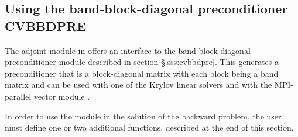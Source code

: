 \subsection{Using the band-block-diagonal preconditioner CVBBDPRE}
The adjoint module in {\cvodes} offers an interface to the band-block-diagonal
preconditioner module {\cvbbdpre} described in section \S\ref{sss:cvbbdpre}.
This generates a preconditioner that is a block-diagonal matrix with each
block being a band matrix and can be used with one of the Krylov linear solvers
and with the MPI-parallel vector module {\nvecp}.

In order to use the {\cvbbdpre} module in the solution of the backward problem,
the user must define one or two additional functions, described at the
end of this section.

